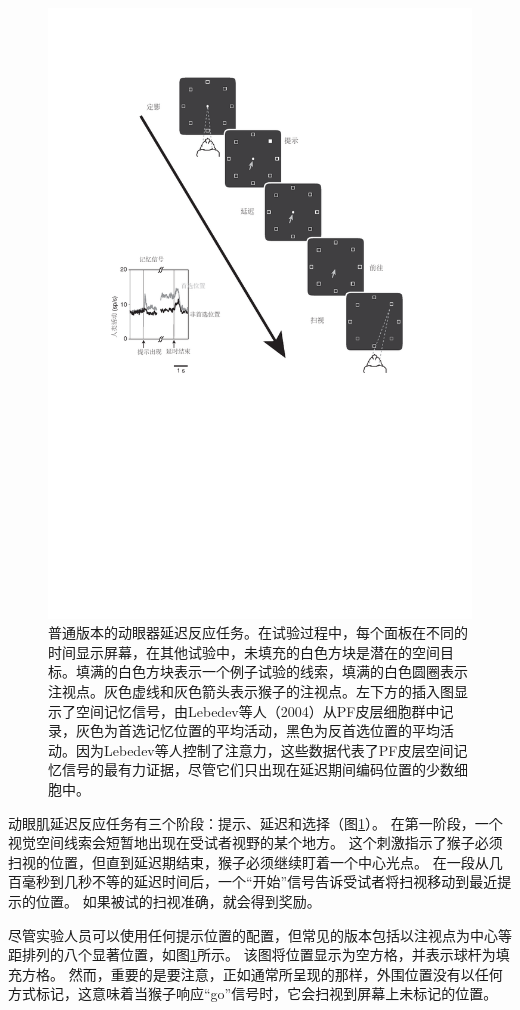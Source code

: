 \begin{figure}
	\centering
	\includegraphics[width=0.7\linewidth]{image_pfc/Fig_5_4}
	\caption{普通版本的动眼器延迟反应任务。在试验过程中，每个面板在不同的时间显示屏幕，在其他试验中，未填充的白色方块是潜在的空间目标。填满的白色方块表示一个例子试验的线索，填满的白色圆圈表示注视点。灰色虚线和灰色箭头表示猴子的注视点。左下方的插入图显示了空间记忆信号，由Lebedev等人（2004）从PF皮层细胞群中记录，灰色为首选记忆位置的平均活动，黑色为反首选位置的平均活动。因为Lebedev等人控制了注意力，这些数据代表了PF皮层空间记忆信号的最有力证据，尽管它们只出现在延迟期间编码位置的少数细胞中。}
	\label{fig:fig_5_4}
\end{figure}


动眼肌延迟反应任务有三个阶段：提示、延迟和选择（图\ref{fig:fig_5_4}）。
在第一阶段，一个视觉空间线索会短暂地出现在受试者视野的某个地方。
这个刺激指示了猴子必须扫视的位置，但直到延迟期结束，猴子必须继续盯着一个中心光点。
在一段从几百毫秒到几秒不等的延迟时间后，一个“开始”信号告诉受试者将扫视移动到最近提示的位置。
如果被试的扫视准确，就会得到奖励。


尽管实验人员可以使用任何提示位置的配置，但常见的版本包括以注视点为中心等距排列的八个显著位置，如图\ref{fig:fig_5_4}所示。
该图将位置显示为空方格，并表示球杆为填充方格。
然而，重要的是要注意，正如通常所呈现的那样，外围位置没有以任何方式标记，这意味着当猴子响应“go”信号时，它会扫视到屏幕上未标记的位置。


